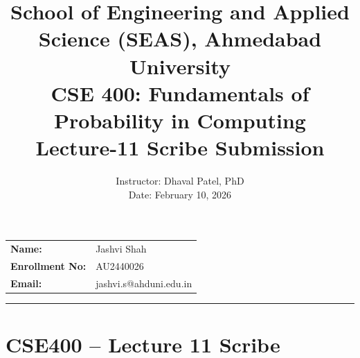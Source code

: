 \documentclass[11pt]{article}
\title{
    \normalsize School of Engineering and Applied Science (SEAS), Ahmedabad University \\
    \vspace{0.2cm}
    \textbf{CSE 400: Fundamentals of Probability in Computing}\\
    \Large Lecture-11 Scribe Submission
}
\author{}
\date{}
\begin{document}
\maketitle

\vspace{-2cm}
\begin{center}
    \begin{tabular}{ll}
        \textbf{Name:} & {Jashvi Shah \hspace{2.5in}} \\ [1.5ex]
        \textbf{Enrollment No:} & {AU2440026 \hspace{2.5in}} \\ [1.5ex]
        \textbf{Email:} & {jashvi.s@ahduni.edu.in \hspace{2.1in}} \\ [1.5ex]
    \end{tabular}
\end{center}

\hrule
\vspace{0.5cm}

\section*{CSE400 – Lecture 11 Scribe}

\date{Instructor: Dhaval Patel, PhD \\ Date: February 10, 2026}
\end{document}
